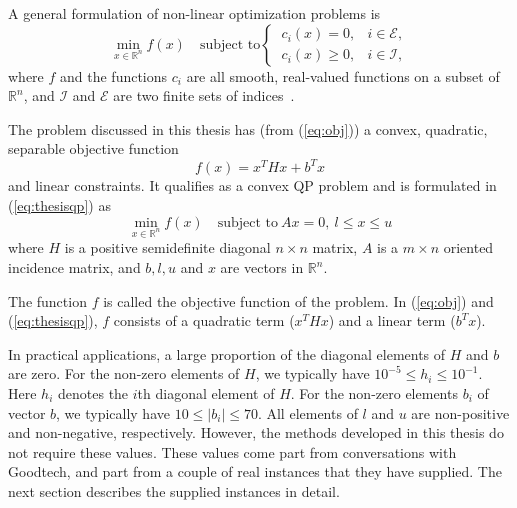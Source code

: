 A general formulation of non-linear optimization problems is
\begin{equation}
    \label{eq:generalqp}
    \min_{x \in \mathbb{R}^n} f(x) \quad \textrm{subject to}
    \begin{cases}
        ~c_i(x) = 0,   & i \in \mathcal{E}, \\
        ~c_i(x) \ge 0, & i \in \mathcal{I},
    \end{cases}
\end{equation}
where $f$ and the functions $c_i$ are all smooth, real-valued functions on a
subset of $\mathbb{R}^n$, and $\mathcal{I}$ and $\mathcal{E}$ are two finite
sets of indices~\cite{nocedal}.

The problem discussed in this thesis has (from (\ref{eq:obj})) a convex,
quadratic, separable objective function
\[
    f(x) = x^T H x + b^T x
\]
and linear constraints. It qualifies as a convex QP problem and is formulated in
(\ref{eq:thesisqp}) as
\[
    \min_{x \in \mathbb{R}^n} f(x)\quad\textrm{subject to}~Ax = 0, ~l \leq x \leq u
\]
where $H$ is a positive semidefinite diagonal $n \times n$ matrix, $A$ is a
$m \times n$ oriented incidence matrix, and $b, l, u$ and $x$ are vectors in
$\mathbb{R}^n$.

The function $f$ is called the objective function of
the problem. In (\ref{eq:obj}) and (\ref{eq:thesisqp}), $f$ consists of a
quadratic term ($x^T H x$) and a linear term ($b^T x$).

In practical applications, a large proportion of the diagonal elements of $H$
and $b$ are zero.
For the non-zero elements of $H$, we typically have
$10^{-5} \le h_i \le 10^{-1}$.
Here $h_i$ denotes the $i$th diagonal element of $H$.
For the non-zero elements $b_i$ of vector $b$, we typically have
$10 \le |b_i| \le 70$. All elements of $l$ and $u$ are non-positive 
and non-negative, respectively. However, the methods developed in this thesis
do not require these values.
These values come part from conversations with Goodtech, and
part from a couple of real instances that they have supplied.
The next section describes the supplied instances in detail.
